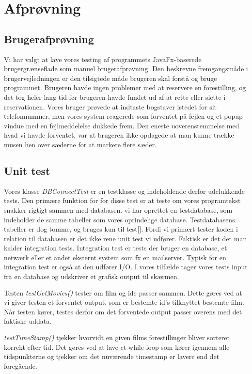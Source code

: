 \documentclass[final]{report}
\begin{document}
\chapter{Afprøvning}

\section{Brugerafprøvning}
Vi har valgt at lave vores testing af programmets JavaFx-baserede brugergrænseflade som manuel brugerafprøvning. Den beskrevne fremgangsmåde i brugervejledningen er den tilsigtede måde brugeren skal forstå og bruge programmet.
Brugeren havde ingen problemer med at reservere en forestilling, og det tog heler lang tid før brugeren havde fundet ud af at rette eller slette i reservationen. Vores bruger prøvede at indtaste bogstaver istedet for sit telefonnummer, men vores system reagerede som forventet på fejlen og et popup-vindue med en fejlmeddelelse dukkede frem. Den eneste uoverenstemmelse med hvad vi havde forventet, var at brugeren ikke opdagede at man kunne trække musen hen over sæderne for at markere flere sæder.  

\section{Unit test}
Vores klasse \emph{DBConnectTest} er en testklasse og indeholdende derfor udelukkende tests. Den primære funktion for for disse test er at teste om vores programtekst snakker rigtigt sammen med databasen. vi har oprettet en testdatabase, som indeholder de samme tabeller som vores oprindelige database. Testdatabasens tabeller er dog tomme, og bruges kun til test[\cite{video}]. 
Fordi vi primært tester koden i relation til databasen er det ikke rene unit test vi udfører. Faktisk er det det man kalder integration tests. Integration test er tests der bruger en database, et netwærk eller et andet eksternt system som fx en mailserver. Typisk for en integration test er også at den udfører I/O. I vores tilfælde tager vores tests input fra en database og udskriver et grafisk output til skærmen. \linebreak

Testen \emph{testGetMovies()} tester om film og ide passer sammen. Dette gøres ved at vi giver testen et forventet output, som er bestemte id's tilknyttet bestemte film. Når testen kører, testes derfor om det forventede output passer overens med det faktiske uddata. 

\emph{testTimeStamp()} tjekker hvorvidt en given films forestillinger bliver sorteret korrekt efter tid. Det gøres ved at lave et while-loop som kører igennem alle tidspunkterne og tjekker om det nuværende timestamp er lavere end det foregående.
\end{document}
